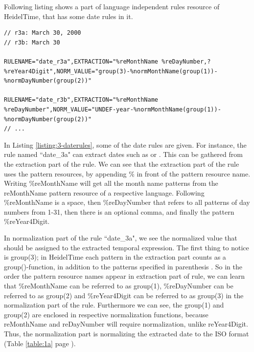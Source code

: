 

Following listing shows a part of language independent rules resource of HeidelTime, that has some date rules in it.  \\

\begin{minipage}{\linewidth}
\begin{lstlisting}[caption={rules\_daterules - a sample rule resource for HeidelTime.}, label={listing:3-daterules}]
// r3a: March 30, 2000
// r3b: March 30

RULENAME="date_r3a",EXTRACTION="%reMonthName %reDayNumber,? %reYear4Digit",NORM_VALUE="group(3)-%normMonthName(group(1))-%normDayNumber(group(2))"

RULENAME="date_r3b",EXTRACTION="%reMonthName %reDayNumber",NORM_VALUE="UNDEF-year-%normMonthName(group(1))-%normDayNumber(group(2))"
// ...
\end{lstlisting}
\end{minipage}


In Listing \ref{listing:3-daterules}, some of the date rules are given. For instance, the rule named ``date\_3a" can extract dates such as  or . This can be gathered from the extraction part of the rule. We can see that the extraction part of the rule uses the pattern resources, by appending \% in front of the pattern resource name. Writing \%reMonthName will get all the month name patterns from the reMonthName pattern resource of a respective language. Following \%reMonthName is a space, then \%reDayNumber that refers to all patterns of day numbers from 1-31, then there is an optional comma, and finally the pattern \%reYear4Digit. 

In normalization part of the rule ``date\_3a", we see the normalized value that should be assigned to the extracted temporal expression. The first thing to notice is group(3); in HeidelTime each pattern in the extraction part counts as a group()-function, in addition to the patterns specified in parenthesis \cite{DBLP:phd/de/Strotgen15}. So in the order the pattern resource names appear in extraction part of rule, we can learn that \%reMonthName can be referred to as group(1), \%reDayNumber can be referred to as group(2) and \%reYear4Digit can be referred to as group(3) in the normalization part of the rule. Furthermore we can see, the group(1) and group(2) are enclosed in respective normalization functions, because reMonthName and reDayNumber will require normalization, unlike reYear4Digit. Thus, the normalization part is normalizing the extracted date to the ISO format (Table \ref{table:1a} page \pageref{table:1a}).

